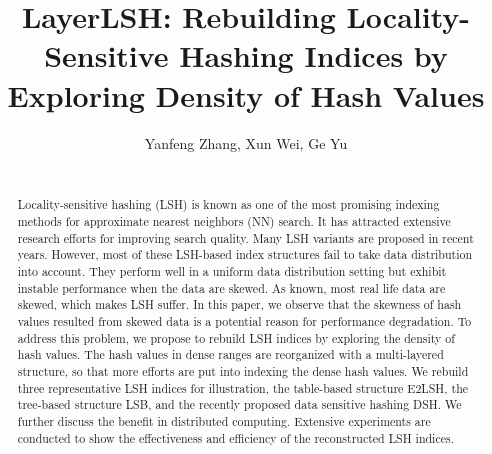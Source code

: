 \documentclass{vldb}
\begin{document}
\newcommand{\Paragraph}[1]{\smallskip{\bf #1.}}
\newcommand{\Paragraphnopunc}[1]{\smallskip\noindent{\bf #1}}
\newcommand{\Paragraphwithindent}[1]{\smallskip{\bf #1.}}
\newcommand{\tabincell}[2]{\begin{tabular}{@{}#1@{}}#2\end{tabular}}
\newcommand{\argmin}{\text{arg}\,\text{min}}
\newcommand{\argmax}{\text{arg}\,\text{max}}

\newtheorem{definition}{Definition}
\newtheorem{prop}{Proposition}
\newtheorem{lemma}{Lemma}
\newtheorem{theorem}{Theorem}


\title{LayerLSH: Rebuilding Locality-Sensitive Hashing Indices by Exploring Density of Hash Values}
\author{
\alignauthor
Yanfeng Zhang, Xun Wei, Ge Yu\\
      \\
}
\date{}
\maketitle

\begin{abstract}
Locality-sensitive hashing (LSH) is known as one of the most promising indexing methods for approximate nearest neighbors (NN) search. It has attracted extensive research efforts for improving search quality. Many LSH variants are proposed in recent years. However, most of these LSH-based index structures fail to take data distribution into account. They perform well in a uniform data distribution setting but exhibit instable performance when the data are skewed. As known, most real life data are skewed, which makes LSH suffer. In this paper, we observe that the skewness of hash values resulted from skewed data is a potential reason for performance degradation. To address this problem, we propose to rebuild LSH indices by exploring the density of hash values. The hash values in dense ranges are reorganized with a multi-layered structure, so that more efforts are put into indexing the dense hash values. We rebuild three representative LSH indices for illustration, the table-based structure E2LSH, the tree-based structure LSB, and the recently proposed data sensitive hashing DSH. We further discuss the benefit in distributed computing. Extensive experiments are conducted to show the effectiveness and efficiency of the reconstructed LSH indices.
\end{abstract}





%










%
\end{document}

